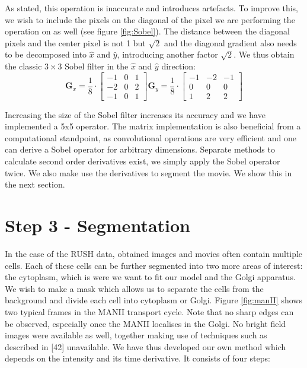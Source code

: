 \documentclass{Dissertate}
\begin{document}
As stated, this operation is inaccurate and introduces artefacts. To
improve this, we wish to include the pixels on the diagonal of the pixel
we are performing the operation on as well (see figure
\ref{fig:Sobel}). The distance between the diagonal pixels and the
center pixel is not 1 but \(\sqrt{2}\) and the diagonal gradient also
needs to be decomposed into \(\hat{x}\) and \(\hat{y}\), introducing
another factor \(\sqrt{2}\). We thus obtain the classic
\(3\times3\) Sobel filter in the $\hat{x}$ and $\hat{y}$ direction:  \[
\mathbf G_x=\frac{1}{8}\cdot
\begin{bmatrix}
-1 & 0 & 1\\
-2 & 0 & 2\\
-1 & 0 & 1
\end{bmatrix}
\mathbf G_y=\frac{1}{8}\cdot
\begin{bmatrix}
-1 & -2 & -1\\
0 & 0 & 0\\
1 & 2 & 2
\end{bmatrix}
\]

Increasing the size of the Sobel filter increases its accuracy and we have
implemented a 5x5 operator. The matrix implementation is also beneficial from a computational standpoint, as convolutional operations are very efficient and one can derive a Sobel operator for arbitrary dimensions. Separate methods to calculate second order derivatives exist, we simply apply the Sobel operator twice. We also make use the derivatives to segment the movie. We show this in the next section. 


\hypertarget{step-3---segmentation}{%
\section{Step 3 - Segmentation}\label{step-3---segmentation}}

In the case of the RUSH data, obtained images and movies often contain
multiple cells. Each of these cells can be further segmented into two
more areas of interest: the cytoplasm, which is were we want to fit our
model and the Golgi apparatus. We wish to make a mask which allows us to
separate the cells from the background and divide each
cell into cytoplasm or Golgi. Figure \ref{fig:manII} shows two
typical frames in the MANII transport cycle. Note that no sharp edges
can be observed, especially once the MANII localises in the Golgi. No
bright field images were available as well, together making use of
techniques such as described in [42] unavailable. We have thus developed our own method which depends on the intensity and its time derivative. It consists of four steps:
\end{document}
